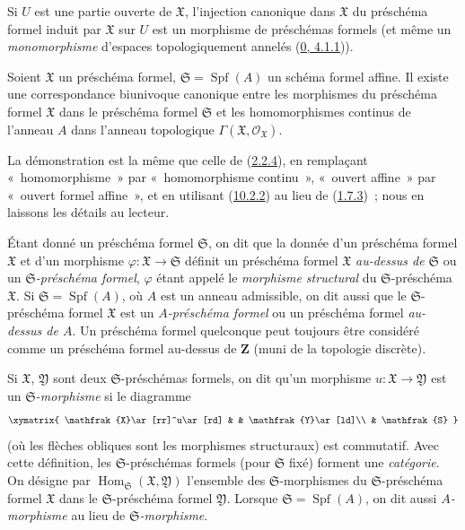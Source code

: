 Si $U$ est une partie ouverte de $\mathfrak{X}$, l'injection canonique
dans $\mathfrak{X}$ du préschéma formel induit par $\mathfrak{X}$ sur $U$
est un morphisme de préschémas formels (et même un
\emph{monomorphisme} d'espaces topologiquement annelés
(\hyperref[0.4.1.1-fr]{0, 4.1.1})).

\begin{proposition}[10.4.6]
\label{I.10.4.6-fr}
Soient $\mathfrak{X}$ un préschéma formel,
$\mathfrak{S}=\operatorname{Spf}(A)$ un schéma formel affine. Il existe
une correspondance biunivoque canonique entre les morphismes du préschéma
formel $\mathfrak{X}$ dans le préschéma formel $\mathfrak{S}$ et les
homomorphismes continus de l'anneau $A$ dans l'anneau topologique
$\Gamma(\mathfrak{X},\mathscr{O}_{\mathfrak{X}})$.
\end{proposition}

La démonstration est la même que celle de
(\hyperref[I.2.2.4-fr]{2.2.4}), en remplaçant «~homomorphisme~» par
«~homomorphisme continu~», «~ouvert affine~» par «~ouvert formel
affine~», et en utilisant (\hyperref[I.10.2.2-fr]{10.2.2}) au lieu de
(\hyperref[I.1.7.3-fr]{1.7.3})~; nous en laissons les détails au lecteur.

\begin{env}[10.4.7]
\label{I.10.4.7-fr}
Étant donné un préschéma formel $\mathfrak{S}$, on dit que la donnée d'un
préschéma formel $\mathfrak{X}$ et d'un morphisme
$\varphi:\mathfrak{X}\to\mathfrak{S}$ définit un préschéma formel
$\mathfrak{X}$ \emph{au-dessus de $\mathfrak{S}$} ou un
\emph{$\mathfrak{S}$-préschéma formel}, $\varphi$ étant appelé le
\emph{morphisme structural} du $\mathfrak{S}$-préschéma
$\mathfrak{X}$. Si $\mathfrak{S}=\operatorname{Spf}(A)$, où $A$ est un
anneau admissible, on dit aussi que le $\mathfrak{S}$-préschéma formel
$\mathfrak{X}$ est un \emph{$A$-préschéma formel} ou un préschéma formel
\emph{au-dessus de $A$}. Un préschéma formel quelconque peut toujours
être considéré comme un préschéma formel au-dessus de $\mathbf{Z}$ (muni
de la topologie discrète).

Si $\mathfrak{X}$, $\mathfrak{Y}$ sont deux $\mathfrak{S}$-préschémas
formels, on dit qu'un morphisme
$u:\mathfrak{X}\to\mathfrak{Y}$ est un
\emph{$\mathfrak{S}$-morphisme} si le diagramme
\[
  \xymatrix{
    \mathfrak{X}\ar[rr]^u\ar[rd] & &
    \mathfrak{Y}\ar[ld]\\
    & \mathfrak{S}
  }
\]
(où les flèches obliques sont les morphismes structuraux) est
commutatif. Avec cette définition, les $\mathfrak{S}$-préschémas formels
(pour $\mathfrak{S}$ fixé) forment une \emph{catégorie}. On désigne par
$\operatorname{Hom}_{\mathfrak{S}}(\mathfrak{X},\mathfrak{Y})$
l'ensemble des $\mathfrak{S}$-morphismes du $\mathfrak{S}$-préschéma
formel $\mathfrak{X}$ dans le $\mathfrak{S}$-préschéma formel
$\mathfrak{Y}$. Lorsque $\mathfrak{S}=\operatorname{Spf}(A)$, on dit
aussi \emph{$A$-morphisme} au lieu de
\emph{$\mathfrak{S}$-morphisme}.
\end{env}

